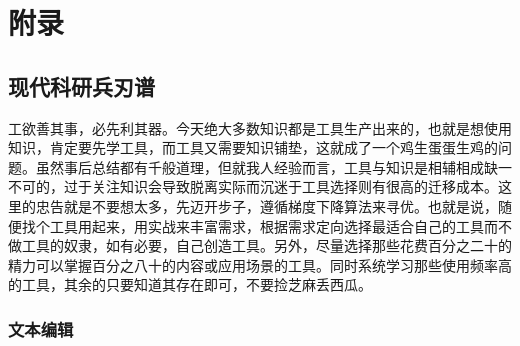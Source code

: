 \documentclass[]{tufte-book}
\begin{document}
\hypertarget{appendix}{%
\chapter*{附录}\label{appendix}}

\hypertarget{ux73b0ux4ee3ux79d1ux7814ux5175ux5203ux8c31}{%
\section*{现代科研兵刃谱}\label{ux73b0ux4ee3ux79d1ux7814ux5175ux5203ux8c31}}

工欲善其事，必先利其器。今天绝大多数知识都是工具生产出来的，也就是想使用知识，肯定要先学工具，而工具又需要知识铺垫，这就成了一个鸡生蛋蛋生鸡的问题。虽然事后总结都有千般道理，但就我人经验而言，工具与知识是相辅相成缺一不可的，过于关注知识会导致脱离实际而沉迷于工具选择则有很高的迁移成本。这里的忠告就是不要想太多，先迈开步子，遵循梯度下降算法来寻优。也就是说，随便找个工具用起来，用实战来丰富需求，根据需求定向选择最适合自己的工具而不做工具的奴隶，如有必要，自己创造工具。另外，尽量选择那些花费百分之二十的精力可以掌握百分之八十的内容或应用场景的工具。同时系统学习那些使用频率高的工具，其余的只要知道其存在即可，不要捡芝麻丢西瓜。

\hypertarget{ux6587ux672cux7f16ux8f91}{%
\subsection*{文本编辑}\label{ux6587ux672cux7f16ux8f91}}
\end{document}
